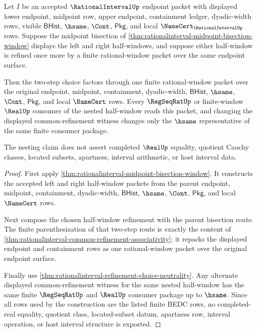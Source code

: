 \begin{theorem}
\label{thm:rationalinterval-bisection-refinement-nesting}
Let $I$ be an accepted $\RationalIntervalUp$ endpoint packet with displayed
lower endpoint, midpoint row, upper endpoint, containment ledger, dyadic-width
rows, visible $\mathsf{BHist}$, $\hsame$, $\Cont$, $\mathsf{Pkg}$, and local
$\NameCert_{\RationalIntervalUp}$ rows. Suppose the midpoint bisection of
\autoref{thm:rationalinterval-midpoint-bisection-window} displays the left and
right half-windows, and suppose either half-window is refined once more by a
finite rational-window packet over the same endpoint surface.

Then the two-step choice factors through one finite rational-window packet over
the original endpoint, midpoint, containment, dyadic-width, $\mathsf{BHist}$,
$\hsame$, $\Cont$, $\mathsf{Pkg}$, and local $\NameCert$ rows. Every
$\RegSeqRatUp$ or finite-window $\RealUp$ consumer of the nested half-window
reads this packet, and changing the displayed common-refinement witness changes
only the $\hsame$ representative of the same finite consumer package.

The nesting claim does not assert completed $\RealUp$ equality, quotient Cauchy
classes, located subsets, apartness, interval arithmetic, or host interval
data.
\end{theorem}
\begin{proof}
First apply \autoref{thm:rationalinterval-midpoint-bisection-window}. It
constructs the accepted left and right half-window packets from the parent
endpoint, midpoint, containment, dyadic-width, $\mathsf{BHist}$, $\hsame$,
$\Cont$, $\mathsf{Pkg}$, and local $\NameCert$ rows.

Next compose the chosen half-window refinement with the parent bisection route.
The finite parenthesization of that two-step route is exactly the content of
\autoref{thm:rationalinterval-common-refinement-associativity}; it repacks the
displayed endpoint and containment rows as one rational-window packet over the
original endpoint surface.

Finally use \autoref{thm:rationalinterval-refinement-choice-neutrality}. Any
alternate displayed common-refinement witness for the same nested half-window
has the same finite $\RegSeqRatUp$ and $\RealUp$ consumer package up to
$\hsame$. Since all rows used by the construction are the listed finite BEDC
rows, no completed-real equality, quotient class, located-subset datum,
apartness row, interval operation, or host interval structure is exported.
\end{proof}
